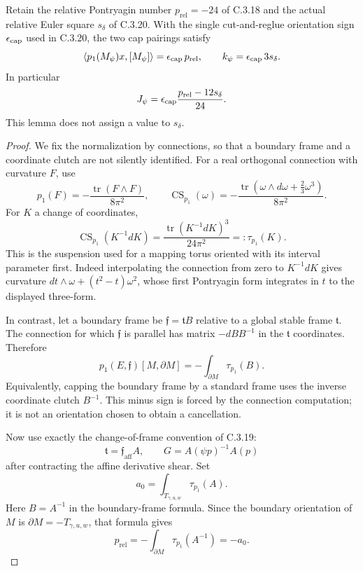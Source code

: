 \begin{lemma}
Retain the relative Pontryagin number
$p_{\mathrm{rel}}=-24$ of C.3.18 and the actual relative
Euler square $s_\delta$ of C.3.20. With the single
cut-and-reglue orientation sign $\epsilon_{\rm cap}$ used
in C.3.20, the two cap pairings satisfy
\[
 \langle p_1(M_\psi)x,[M_\psi]\rangle
       =\epsilon_{\rm cap}\,p_{\mathrm{rel}},
 \qquad
 k_\psi=\epsilon_{\rm cap}\,3s_\delta.
\]
In particular
\[
 J_\psi=\epsilon_{\rm cap}
              \frac{p_{\mathrm{rel}}-12s_\delta}{24}.
\]
This lemma does not assign a value to $s_\delta$.
\end{lemma}
\begin{proof}
We fix the normalization by connections, so that a boundary
frame and a coordinate clutch are not silently identified.
For a real orthogonal connection with curvature $F$, use
\[
 p_1(F)=-\frac{\operatorname{tr}(F\wedge F)}{8\pi^2},
 \qquad
 \operatorname{CS}_{p_1}(\omega)
 =-\frac{\operatorname{tr}(\omega\wedge d\omega
                          +\tfrac23\omega^3)}{8\pi^2}.
\]
For $K$ a change of coordinates,
\[
 \operatorname{CS}_{p_1}(K^{-1}dK)
 =\frac{\operatorname{tr}(K^{-1}dK)^3}{24\pi^2}
 =:\tau_{p_1}(K).
\]
This is the suspension used for a mapping torus oriented
with its interval parameter first. Indeed interpolating
the connection from zero to $K^{-1}dK$ gives curvature
$dt\wedge\omega+(t^2-t)\omega^2$, whose first Pontryagin
form integrates in $t$ to the displayed three-form.

In contrast, let a boundary frame be
$\mathfrak f=\mathfrak t B$ relative to a global stable
frame $\mathfrak t$. The connection for which
$\mathfrak f$ is parallel has matrix $-dB B^{-1}$ in
the $\mathfrak t$ coordinates. Therefore
\[
 p_1(E,\mathfrak f)[M,\partial M]
 =-\int_{\partial M}\tau_{p_1}(B).
\]
Equivalently, capping the boundary frame by a standard
frame uses the inverse coordinate clutch $B^{-1}$.
This minus sign is forced by the connection computation;
it is not an orientation chosen to obtain a cancellation.

Now use exactly the change-of-frame convention of C.3.19:
\[
 \mathfrak t=\mathfrak f_{\mathrm{aff}} A,
 \qquad
 G=A(\psi p)^{-1}A(p)
\]
after contracting the affine derivative shear. Set
\[
 a_0=\int_{T_{\gamma,u,w}}\tau_{p_1}(A).
\]
Here $B=A^{-1}$ in the boundary-frame formula. Since
the boundary orientation of $M$ is
$\partial M=-T_{\gamma,u,w}$, that formula gives
\[
 p_{\mathrm{rel}}
 =-\int_{\partial M}\tau_{p_1}(A^{-1})
 =-a_0.
\]


\end{proof}
